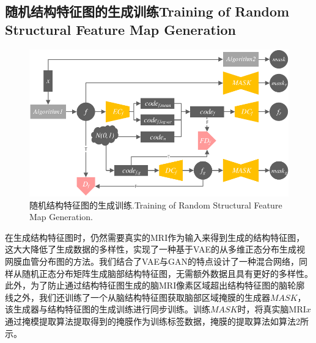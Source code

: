 \documentclass[letterpaper]{article} %
\begin{document}
\subsection{随机结构特征图的生成训练Training of Random Structural Feature Map Generation}
\begin{figure}
	\centering
	\includegraphics[width=0.98\columnwidth]{figures/feature_train}
	\caption{随机结构特征图的生成训练.Training of Random Structural Feature Map Generation.}
	\label{feature_train}
\end{figure}
在生成结构特征图时，\cite{4shin2018medical}仍然需要真实的MRI作为输入来得到生成的结构特征图，这大大降低了生成数据的多样性，\cite{41costa2017towards}实现了一种基于VAE的从多维正态分布生成视网膜血管分布图的方法。我们结合了VAE与GAN的特点设计了一种混合网络，同样从随机正态分布矩阵生成脑部结构特征图，无需额外数据且具有更好的多样性。
此外，为了防止通过结构特征图生成的脑MRI像素区域超出结构特征图的脑轮廓线之外，我们还训练了一个从脑结构特征图获取脑部区域掩膜的生成器$MASK$，该生成器与结构特征图的生成训练进行同步训练。训练$MASK$时，将真实脑MRI$x$通过掩模提取算法提取得到的掩膜作为训练标签数据，掩膜的提取算法如算法2所示。
\end{document}
